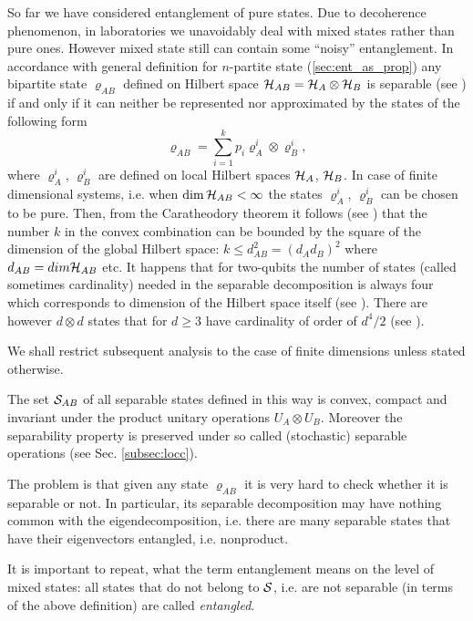 \documentclass[rmp,12pt,preprint]{revtex4-2}
\begin{document}
So far we have considered entanglement of pure states. Due to
decoherence phenomenon, in laboratories we unavoidably deal with mixed
states rather than pure ones. However mixed state still can contain
some ``noisy'' entanglement. In accordance with general definition for
$n$-partite state (\ref{sec:ent_as_prop}) any bipartite state $
\varrho_{AB}$ defined on Hilbert space ${\cal H}_{AB}={\cal H}_{A}
\otimes {\cal H}_{B}$ is separable (see \cite{Werner1989}) if and only
if it can neither be represented nor approximated by the states of the
following form
\begin{equation}
\varrho_{AB} = \sum_{i=1}^{k} p_{i} \varrho_{A}^{i} \otimes
\varrho_{B}^{i},
\label{eq:sep_def}
\end{equation}
where $\varrho_{A}^{i}$, $\varrho_{B}^{i}$ are defined on local
Hilbert spaces ${\cal H}_{A}$, ${\cal H}_{B}$. In case of finite
dimensional systems, i.e. when $\dim{\cal H}_{AB} < \infty $ the
states $\varrho_{A}^{i}$, $\varrho_{B}^{i}$ can be chosen to be
pure. Then, from the Caratheodory theorem it follows (see
\cite{Pawel97,PlenioVedral1998}) that the number $k$ in the convex
combination can be bounded by the square of the dimension of the
global Hilbert space: $k\leq d_{AB}^{2}=(d_{A}d_{B})^{2}$ where
$d_{AB}=dim{\cal H}_{AB}$ etc. It happens that for two-qubits the
number of states (called sometimes cardinality) needed in the
separable decomposition is always four which corresponds to dimension
of the Hilbert space itself (see
\cite{SanperaTarrachVidal,Wootters-conc}). There are however $d
\otimes d$ states that for $d\ge3$ have cardinality of order of
$d^{4}/2$ (see \cite{Barely}).

We shall restrict subsequent analysis to the case of finite
dimensions unless stated otherwise.

The set ${\cal S}_{AB}$ of all separable states defined in this way is
convex, compact and invariant under the product unitary operations
$U_{A} \otimes U_{B}$. Moreover the separability property is preserved
under so called (stochastic) separable operations (see Sec.
\ref{subsec:locc}).

The problem is that given any state $\varrho_{AB}$ it is very hard to
check whether it is separable or not. In particular, its separable
decomposition may have nothing common with the eigendecomposition,
i.e. there are many separable states that have their eigenvectors
entangled, i.e. nonproduct.

It is important to repeat, what the term entanglement means on the
level of mixed states: all states that do not belong to ${\cal S}$,
i.e.  are not separable (in terms of the above definition) are called
{\it entangled}.
\end{document}
